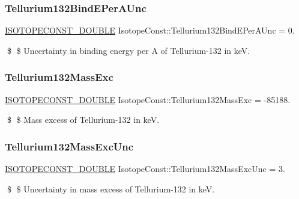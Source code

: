 \subsubsection{\texorpdfstring{Tellurium132\+Bind\+E\+Per\+A\+Unc}{Tellurium132BindEPerAUnc}}
{\footnotesize\ttfamily \mbox{\hyperlink{group___isotope_const-_macros_ga8f45a7272ce02c0b4c65c44636ed719a}{I\+S\+O\+T\+O\+P\+E\+C\+O\+N\+S\+T\+\_\+\+D\+O\+U\+B\+LE}} Isotope\+Const\+::\+Tellurium132\+Bind\+E\+Per\+A\+Unc = 0.}

\$ \$ Uncertainty in binding energy per A of Tellurium-\/132 in keV. \mbox{\label{group___isotope_const-_tellurium-_te132_gaa900b5d175b684f3ae7f1a87355881c2}} 
\subsubsection{\texorpdfstring{Tellurium132\+Mass\+Exc}{Tellurium132MassExc}}
{\footnotesize\ttfamily \mbox{\hyperlink{group___isotope_const-_macros_ga8f45a7272ce02c0b4c65c44636ed719a}{I\+S\+O\+T\+O\+P\+E\+C\+O\+N\+S\+T\+\_\+\+D\+O\+U\+B\+LE}} Isotope\+Const\+::\+Tellurium132\+Mass\+Exc = -\/85188.}

\$ \$ Mass excess of Tellurium-\/132 in keV. \mbox{\label{group___isotope_const-_tellurium-_te132_ga3e4c524ce6c656f63522352351b34e2a}} 
\subsubsection{\texorpdfstring{Tellurium132\+Mass\+Exc\+Unc}{Tellurium132MassExcUnc}}
{\footnotesize\ttfamily \mbox{\hyperlink{group___isotope_const-_macros_ga8f45a7272ce02c0b4c65c44636ed719a}{I\+S\+O\+T\+O\+P\+E\+C\+O\+N\+S\+T\+\_\+\+D\+O\+U\+B\+LE}} Isotope\+Const\+::\+Tellurium132\+Mass\+Exc\+Unc = 3.}

\$ \$ Uncertainty in mass excess of Tellurium-\/132 in keV. \mbox{\label{group___isotope_const-_tellurium-_te132_ga6560f23356e4ba567d8e2cf1ead3287b}} 
